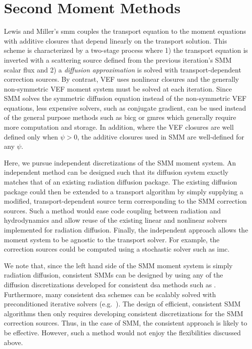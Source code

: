 \documentclass[../doc.tex]{subfiles}
\begin{document}
\chapter{Second Moment Methods} \label{chap:smm}
Lewis and Miller's \gls{smm} \cite{lewis_miller} couples the transport equation to the moment equations with additive closures that depend linearly on the transport solution. This scheme is characterized by a two-stage process where 1) the transport equation is inverted with a scattering source defined from the previous iteration's SMM scalar flux and 2) a \emph{diffusion approximation} is solved with transport-dependent correction sources. By contrast, VEF uses nonlinear closures and the generally non-symmetric VEF moment system must be solved at each iteration. Since SMM solves the symmetric diffusion equation instead of the non-symmetric VEF equations, less expensive solvers, such as conjugate gradient, can be used instead of the general purpose methods such as \gls{bicg} or \gls{gmres} which generally require more computation and storage. 
In addition, where the VEF closures are well defined only when $\psi>0$, the additive closures used in SMM are well-defined for any $\psi$. 

Here, we pursue independent discretizations of the SMM moment system. 
An independent method can be designed such that its diffusion system exactly matches that of an existing radiation diffusion package. The existing diffusion package could then be extended to a transport algorithm by simply supplying a modified, transport-dependent source term corresponding to the SMM correction sources. Such a method would ease code coupling between radiation and hydrodynamics and allow reuse of the existing linear and nonlinear solvers implemented for radiation diffusion. Finally, the independent approach allows the moment system to be agnostic to the transport solver. For example, the correction sources could be computed using a stochastic solver such as \gls{imc}. 

We note that, since the left hand side of the SMM moment system is simply radiation diffusion, consistent SMMs can be designed by using any of the diffusion discretizations developed for consistent \gls{dsa} methods such as \textcite{WWM,AM,WR,ldrd_dsa}. Furthermore, many consistent \gls{dsa} schemes can be scalably solved with preconditioned iterative solvers (e.g.~\cite{ldrd_dsa,WR}). The design of efficient, consistent SMM algorithms then only requires developing consistent discretizations for the SMM correction sources. Thus, in the case of SMM, the consistent approach is likely to be effective. However, such a method would not enjoy the flexibilities discussed above. 
\end{document}
